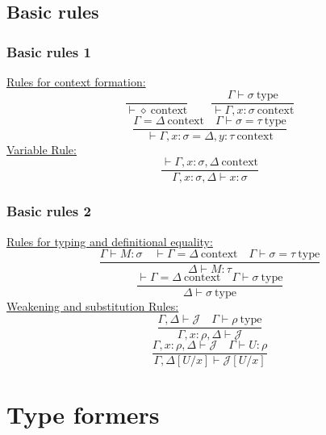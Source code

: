 \documentclass[aspectratio=169]{beamer}
\newcommand{\cntxt}{\ \mathrm{context}}
\newcommand{\typ}{\ \mathrm{type}}
\begin{document}
    \subsection{Basic rules}
    \begin{frame}
        \frametitle{Basic rules 1}
        \underline{Rules for context formation:}
        $$\frac{}{\vdash \diamond \cntxt} \qquad \frac{\Gamma \vdash \sigma \typ}{\vdash \Gamma, x: \sigma \cntxt}$$
        $$\frac{\Gamma = \Delta \cntxt \quad \Gamma \vdash \sigma = \tau \typ}{\vdash \Gamma, x: \sigma = \Delta, y:\tau \cntxt}$$
        \underline{Variable Rule:}
        $$\frac{\vdash \Gamma, x: \sigma, \Delta \cntxt}{\Gamma, x:\sigma,\Delta\vdash x : \sigma}$$
    \end{frame}
    \begin{frame}
        \frametitle{Basic rules 2}
        \underline{Rules for typing and definitional equality:}
        $$\frac{\Gamma \vdash M : \sigma \quad \vdash \Gamma = \Delta \cntxt \quad \Gamma \vdash \sigma = \tau \typ}{\Delta \vdash M : \tau}$$
        $$\frac{\vdash \Gamma = \Delta \cntxt \quad \Gamma \vdash \sigma \typ}{\Delta \vdash \sigma \typ}$$
        \underline{Weakening and substitution Rules:}
        $$\frac{\Gamma, \Delta \vdash \mathcal{J} \quad \Gamma \vdash \rho \typ}{\Gamma, x: \rho, \Delta\vdash \mathcal{J}}$$
        $$\frac{\Gamma,x:\rho,\Delta \vdash \mathcal{J}\quad \Gamma \vdash U: \rho}{\Gamma,\Delta[U/x]\vdash \mathcal{J}[U/x]}$$
    \end{frame}
    \section{Type formers}
\end{document}
